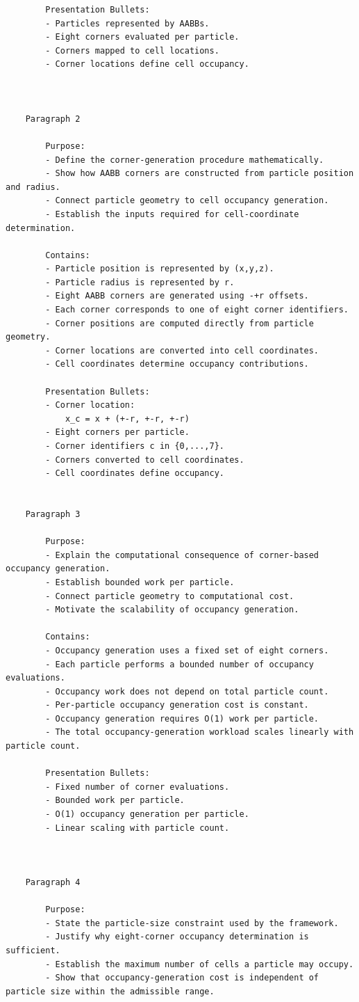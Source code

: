 \begin{verbatim}
		Presentation Bullets:
		- Particles represented by AABBs.
		- Eight corners evaluated per particle.
		- Corners mapped to cell locations.
		- Corner locations define cell occupancy.



	Paragraph 2

		Purpose:
		- Define the corner-generation procedure mathematically.
		- Show how AABB corners are constructed from particle position and radius.
		- Connect particle geometry to cell occupancy generation.
		- Establish the inputs required for cell-coordinate determination.

		Contains:
		- Particle position is represented by (x,y,z).
		- Particle radius is represented by r.
		- Eight AABB corners are generated using -+r offsets.
		- Each corner corresponds to one of eight corner identifiers.
		- Corner positions are computed directly from particle geometry.
		- Corner locations are converted into cell coordinates.
		- Cell coordinates determine occupancy contributions.

		Presentation Bullets:
		- Corner location:
			x_c = x + (+-r, +-r, +-r)
		- Eight corners per particle.
		- Corner identifiers c in {0,...,7}.
		- Corners converted to cell coordinates.
		- Cell coordinates define occupancy.


	Paragraph 3

		Purpose:
		- Explain the computational consequence of corner-based occupancy generation.
		- Establish bounded work per particle.
		- Connect particle geometry to computational cost.
		- Motivate the scalability of occupancy generation.

		Contains:
		- Occupancy generation uses a fixed set of eight corners.
		- Each particle performs a bounded number of occupancy evaluations.
		- Occupancy work does not depend on total particle count.
		- Per-particle occupancy generation cost is constant.
		- Occupancy generation requires O(1) work per particle.
		- The total occupancy-generation workload scales linearly with particle count.

		Presentation Bullets:
		- Fixed number of corner evaluations.
		- Bounded work per particle.
		- O(1) occupancy generation per particle.
		- Linear scaling with particle count.



	Paragraph 4

		Purpose:
		- State the particle-size constraint used by the framework.
		- Justify why eight-corner occupancy determination is sufficient.
		- Establish the maximum number of cells a particle may occupy.
		- Show that occupancy-generation cost is independent of particle size within the admissible range.


\end{verbatim}
